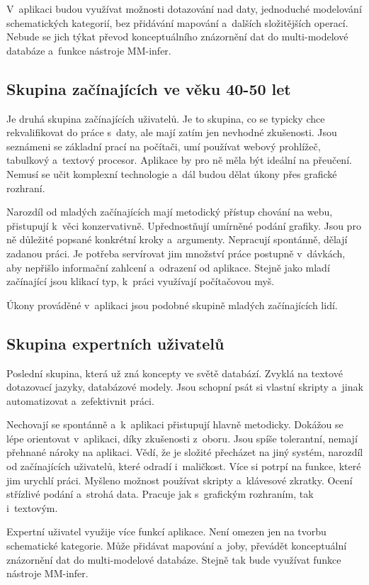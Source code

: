 V~aplikaci budou využívat možnosti dotazování nad daty, jednoduché modelování schematických kategorií, bez přidávání mapování a~dalších složitějších operací. Nebude se jich týkat převod konceptuálního znázornění dat do multi-modelové databáze a~funkce nástroje MM-infer.

\subsection{Skupina začínajících ve věku 40-50 let}

Je druhá skupina začínajících uživatelů. Je to skupina, co se typicky chce rekvalifikovat do práce s~daty, ale mají zatím jen nevhodné zkušenosti. Jsou seznámeni se základní prací na počítači, umí používat webový prohlížeč, tabulkový a~textový procesor. Aplikace by pro ně měla být ideální na přeučení. Nemusí se učit komplexní technologie a~dál budou dělat úkony přes grafické rozhraní.

Narozdíl od mladých začínajících mají metodický přístup chování na webu, přistupují k~věci konzervativně. Upřednostňují umírněné podání grafiky. Jsou pro ně důležité popsané konkrétní kroky a~argumenty. Nepracují spontánně, dělají zadanou práci. Je potřeba servírovat jim množství práce postupně v~dávkách, aby nepřišlo informační zahlcení a~odrazení od aplikace. Stejně jako mladí začínající jsou klikací typ, k~práci využívají počítačovou myš. 

Úkony prováděné v~aplikaci jsou podobné skupině mladých začínajících lidí.

\subsection{Skupina expertních uživatelů}

Poslední skupina, která už zná koncepty ve světě databází. Zvyklá na textové dotazovací jazyky, databázové modely. Jsou schopní psát si vlastní skripty a~jinak automatizovat a~zefektivnit práci.

Nechovají se spontánně a~k~aplikaci přistupují hlavně metodicky. Dokážou se lépe orientovat v~aplikaci, díky zkušenosti z~oboru. Jsou spíše tolerantní, nemají přehnané nároky na aplikaci. Vědí, že je složité přecházet na jiný systém, narozdíl od začínajících uživatelů, které odradí i~maličkost. Více si potrpí na funkce, které jim urychlí práci. Myšleno možnost používat skripty a~klávesové zkratky. Ocení střízlivé podání a~strohá data. Pracuje jak s~grafickým rozhraním, tak i~textovým.

Expertní uživatel využije více funkcí aplikace. Není omezen jen na tvorbu schematické kategorie. Může přidávat mapování a~joby, převádět konceptuální znázornění dat do multi-modelové databáze. Stejně tak bude využívat funkce nástroje MM-infer.
